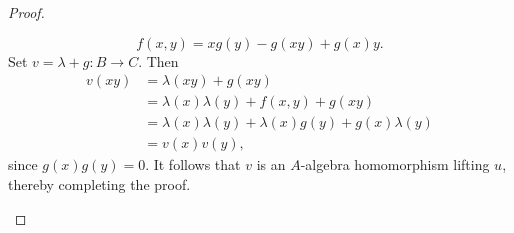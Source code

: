 \begin{proof}
\begin{enumerate}[label=(\arabic*)]
    \begin{equation*}
        f(x, y) = xg(y) - g(xy) + g(x)y.
    \end{equation*}
    Set $v = \lambda + g\colon B\to C$. Then 
    \begin{align*}
        v(xy) &= \lambda(xy) + g(xy)\\
        &= \lambda(x)\lambda(y) + f(x, y) + g(xy)\\
        &= \lambda(x)\lambda(y) + \lambda(x)g(y) + g(x)\lambda(y)\\
        &= v(x)v(y),
    \end{align*}
    since $g(x)g(y) = 0$. It follows that $v$ is an $A$-algebra homomorphism lifting $u$, thereby completing the proof.
\end{enumerate}
\end{proof}

